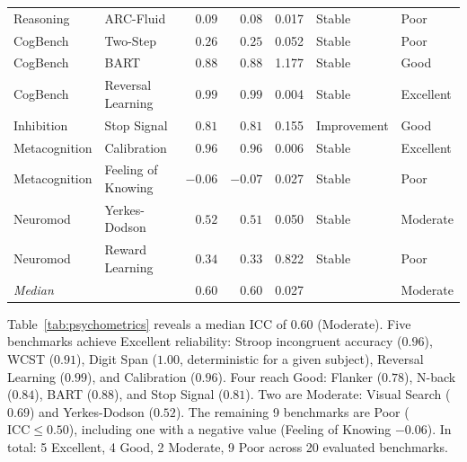 \documentclass[11pt,letterpaper]{article}
\begin{document}
\begin{table}[t]
\begin{tabular}{@{}llrrcll@{}}
Reasoning     & ARC-Fluid          &  $0.09$ &  $0.08$ & 0.017 & Stable      & Poor \\
CogBench      & Two-Step           &  $0.26$ &  $0.25$ & 0.052 & Stable      & Poor \\
CogBench      & BART               &  $\mathbf{0.88}$ &  $\mathbf{0.88}$ & 1.177 & Stable      & Good \\
CogBench      & Reversal Learning  &  $\mathbf{0.99}$ &  $\mathbf{0.99}$ & 0.004 & Stable      & Excellent \\
Inhibition    & Stop Signal        &  $\mathbf{0.81}$ &  $\mathbf{0.81}$ & 0.155 & Improvement & Good \\
Metacognition & Calibration        &  $\mathbf{0.96}$ &  $\mathbf{0.96}$ & 0.006 & Stable      & Excellent \\
Metacognition & Feeling of Knowing & $-0.06$ & $-0.07$ & 0.027 & Stable      & Poor \\
Neuromod      & Yerkes-Dodson      &  $0.52$ &  $0.51$ & 0.050 & Stable      & Moderate \\
Neuromod      & Reward Learning    &  $0.34$ &  $0.33$ & 0.822 & Stable      & Poor \\
\midrule
\multicolumn{2}{l}{\emph{Median}} & $0.60$ & $0.60$ & 0.027 & & Moderate \\
\bottomrule
\end{tabular}
\end{table}

Table~\ref{tab:psychometrics} reveals a median ICC of $0.60$ (Moderate). Five benchmarks achieve Excellent reliability: Stroop incongruent accuracy ($0.96$), WCST ($0.91$), Digit Span ($1.00$, deterministic for a given subject), Reversal Learning ($0.99$), and Calibration ($0.96$). Four reach Good: Flanker ($0.78$), N-back ($0.84$), BART ($0.88$), and Stop Signal ($0.81$). Two are Moderate: Visual Search ($0.69$) and Yerkes-Dodson ($0.52$). The remaining 9 benchmarks are Poor ($\text{ICC} \leq 0.50$), including one with a negative value (Feeling of Knowing $-0.06$). In total: 5 Excellent, 4 Good, 2 Moderate, 9 Poor across 20 evaluated benchmarks.
\end{document}

